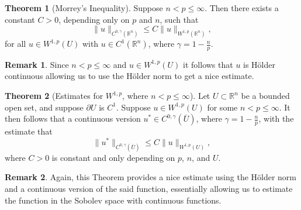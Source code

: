 \documentclass[11pt]{article}
\theoremstyle{definition}
\newtheorem*{theorem}{Theorem}
\newtheorem*{remark}{Remark}
\begin{document}
\begin{theorem}[Morrey's Inequality]
Suppose $n < p \leq \infty$. Then there exists a constant $C > 0$, depending only on $p$ and $n$, such that
	\[\|u\|_{C^{0,\gamma}(\mathbb{R}^n)} \leq C\|u\|_{W^{1,p}(\mathbb{R}^n)},\]
for all $u \in W^{1,p}(U)$ with $u \in C^1(\mathbb{R}^n)$, where $\gamma = 1 - \frac{n}{p}$.
\end{theorem}
\begin{remark}
Since $n < p \leq \infty$ and $u \in W^{1,p}(U)$ it follows that $u$ is H\"{o}lder continuous allowing us
	to use the H\"{o}lder norm to get a nice estimate.
\end{remark}

\begin{theorem}[Estimates for $W^{1,p}$, where $n < p \leq \infty$]
Let $U \subset \mathbb{R}^n$ be a bounded open set, and suppose $\partial U$ is $C^1$.
	Suppose $u \in W^{1,p}(U)$ for some $n < p \leq \infty$. It then follows that a continuous version $u^* \in C^{0,\gamma}(\overline{U})$,
where $\gamma = 1 - \frac{n}{p}$, with the estimate that
	\[\|u^*\|_{C^{0,\gamma}(\overline{U})} \leq C\|u\|_{W^{1,p}(U)},\]
where $C > 0$ is constant and only depending on $p$, $n$, and $U$.
\end{theorem}
\begin{remark}
	Again, this Theorem provides a nice estimate using the H\"{o}lder norm and a continuous version of the said function,
	essentially allowing us to estimate the function in the Sobolev space with continuous functions.
\end{remark}

\newpage
\end{document}
